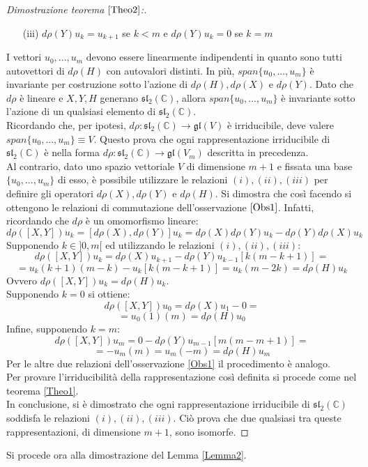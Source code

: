 \documentclass[12pt,a4paper]{report}
\theoremstyle{definition}
\theoremstyle{Theorem}
\theoremstyle{definition}
\theoremstyle{definition}
\theoremstyle{definition}
\begin{document}
\begin{proof}[Dimostrazione teorema $\ref{Theo2}$:]
\begin{itemize}
		\item[(iii)] $d\rho(Y)u_k=u_{k+1}$ se $k<m$ e $d\rho(Y)u_k=0$ se $k=m$
	\end{itemize}
I vettori $u_0,...,u_m$ devono essere linearmente indipendenti in quanto sono tutti autovettori di $d\rho(H)$ con autovalori distinti. In più, $span\{u_0,...,u_m\}$ è invariante per costruzione sotto l'azione di $d\rho(H),d\rho(X)$ e $d\rho(Y)$. Dato che $d\rho$ è lineare e $X,Y,H$ generano $\mathfrak{sl_2(\mathbb{C})}$, allora $span\{u_0,...,u_m\}$ è invariante sotto l'azione di un qualsiasi elemento di $\mathfrak{sl_2(\mathbb{C})}$.\\
Ricordando che, per ipotesi, $d\rho:\mathfrak{sl_2(\mathbb{C})}\rightarrow \mathfrak{gl}(V)$ è irriducibile, deve valere\\ $span\{u_0,...,u_m\}\equiv V$. Questo prova che ogni rappresentazione irriducibile di $\mathfrak{sl_2(\mathbb{C})}$ è nella forma $d\rho:\mathfrak{sl_2(\mathbb{C})}\rightarrow \mathfrak{gl}(V_m)$ descritta in precedenza.\\
Al contrario, dato uno spazio vettoriale $V$ di dimensione $m+1$ e fissata una base $\{u_0,...,u_m\}$ di esso, è possibile utilizzare le relazioni $(i),(ii),(iii)$ per definire gli operatori $d\rho(X),d\rho(Y)$ e $d\rho(H)$. Si dimostra che così facendo si ottengono le relazioni di commutazione dell'osservazione $\ref{Obs1}$. Infatti, ricordando che $d\rho$ è un omomorfismo lineare:
$$d\rho([X,Y])u_k=[d\rho(X),d\rho(Y)]u_k=d\rho(X)d\rho(Y)u_k-d\rho(Y)d\rho(X)u_k$$
Supponendo $k\in ]0,m[$ ed utilizzando le relazioni $(i),(ii),(iii)$:
$$d\rho([X,Y])u_k=d\rho(X)u_{k+1}-d\rho(Y)u_{k-1}[k(m-k+1)]=$$
$$=u_k(k+1)(m-k)-u_k[k(m-k+1)]=u_k(m-2k)=d\rho(H)u_k$$
Ovvero $d\rho([X,Y])u_k=d\rho(H)u_k$.\\
Supponendo $k=0$ si ottiene: $$d\rho([X,Y])u_0=d\rho(X)u_{1}-0=$$
$$=u_0(1)(m)=d\rho(H)u_0$$
Infine, supponendo $k=m$:
$$d\rho([X,Y])u_m=0-d\rho(Y)u_{m-1}[m(m-m+1)]=$$
$$=-u_m(m)=u_m(-m)=d\rho(H)u_m$$
Per le altre due relazioni dell'osservazione \ref{Obs1} il procedimento è analogo.\\
Per provare l'irriducibilità della rappresentazione così definita si procede come nel teorema \ref{Theo1}.\\
In conclusione, si è dimostrato che ogni rappresentazione irriducibile di $\mathfrak{sl_2(\mathbb{C})}$ soddisfa le relazioni $(i),(ii),(iii)$. Ciò prova che due qualsiasi tra queste rappresentazioni, di dimensione $m+1$, sono isomorfe.
\end{proof}
Si procede ora alla dimostrazione del Lemma \ref{Lemma2}.
\end{document}
